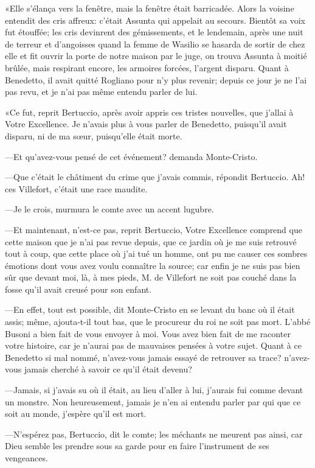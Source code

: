 «Elle s'élança vers la fenêtre, mais la fenêtre était barricadée. Alors la voisine entendit des cris affreux: c'était Assunta qui appelait au secours. Bientôt sa voix fut étouffée; les cris devinrent des gémissements, et le lendemain, après une nuit de terreur et d'angoisses quand la femme de Wasilio se hasarda de sortir de chez elle et fit ouvrir la porte de notre maison par le juge, on trouva Assunta à moitié brûlée, mais respirant encore, les armoires forcées, l'argent disparu. Quant à Benedetto, il avait quitté Rogliano pour n'y plus revenir; depuis ce jour je ne l'ai pas revu, et je n'ai pas même entendu parler de lui. 

«Ce fut, reprit Bertuccio, après avoir appris ces tristes nouvelles, que j'allai à Votre Excellence. Je n'avais plus à vous parler de Benedetto, puisqu'il avait disparu, ni de ma sœur, puisqu'elle était morte. 

—Et qu'avez-vous pensé de cet événement? demanda Monte-Cristo. 

—Que c'était le châtiment du crime que j'avais commis, répondit Bertuccio. Ah! ces Villefort, c'était une race maudite. 

—Je le crois, murmura le comte avec un accent lugubre. 

—Et maintenant, n'est-ce pas, reprit Bertuccio, Votre Excellence comprend que cette maison que je n'ai pas revue depuis, que ce jardin où je me suis retrouvé tout à coup, que cette place où j'ai tué un homme, ont pu me causer ces sombres émotions dont vous avez voulu connaître la source; car enfin je ne suis pas bien sûr que devant moi, là, à mes pieds, M. de Villefort ne soit pas couché dans la fosse qu'il avait creusé pour son enfant. 

—En effet, tout est possible, dit Monte-Cristo en se levant du banc où il était assis; même, ajouta-t-il tout bas, que le procureur du roi ne soit pas mort. L'abbé Busoni a bien fait de vous envoyer à moi. Vous avez bien fait de me raconter votre histoire, car je n'aurai pas de mauvaises pensées à votre sujet. Quant à ce Benedetto si mal nommé, n'avez-vous jamais essayé de retrouver sa trace? n'avez-vous jamais cherché à savoir ce qu'il était devenu? 

—Jamais, si j'avais su où il était, au lieu d'aller à lui, j'aurais fui comme devant un monstre. Non heureusement, jamais je n'en ai entendu parler par qui que ce soit au monde, j'espère qu'il est mort. 

—N'espérez pas, Bertuccio, dit le comte; les méchants ne meurent pas ainsi, car Dieu semble les prendre sous sa garde pour en faire l'instrument de ses vengeances. 

